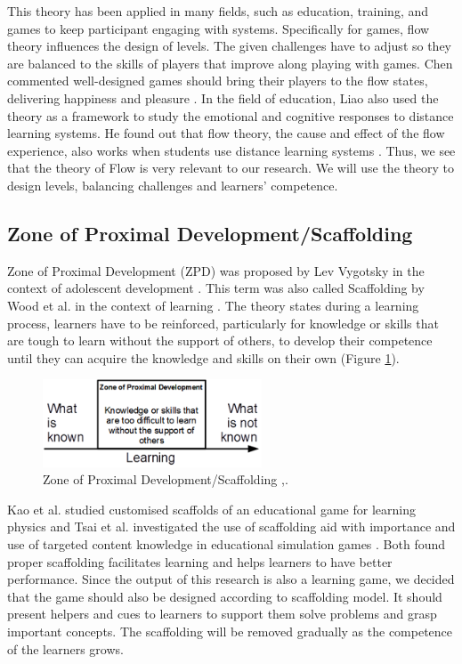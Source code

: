 \documentclass[12pt, a4paper]{report}
\begin{document}
This theory has been applied in many fields, such as education, training, and games to keep participant engaging with systems. Specifically for games, flow theory influences the design of levels. The given challenges have to adjust so they are balanced to the skills of players that improve along playing with games. Chen commented well-designed games should bring their players to the flow states, delivering happiness and pleasure \cite{chen2007flow}. In the field of education, Liao also used the theory as a framework to study the emotional and cognitive responses to distance learning systems. He found out that flow theory, the cause and effect of the flow experience, also works when students use distance learning systems \cite{liao2006flow}. Thus, we see that the theory of Flow is very relevant to our research. We will use the theory to design levels, balancing challenges and learners' competence. 

\subsection{Zone of Proximal Development/Scaffolding}
Zone of Proximal Development (ZPD) was proposed by Lev Vygotsky in the context of adolescent development \cite{vygotsky1978mind}. This term was also called Scaffolding by Wood et al. in the context of learning \cite{wood1976role}. The theory states during a learning process, learners have to be reinforced, particularly for knowledge or skills that are tough to learn without the support of others, to develop their competence until they can acquire the knowledge and skills on their own (Figure \ref{scaffolding}). 

\begin{figure}[ht]
\centering
\includegraphics[width=6.5cm]{scaffolding}
\caption{Zone of Proximal Development/Scaffolding \cite{vygotsky1978mind},\cite{wood1976role}.}
\label{scaffolding}
\end{figure}

Kao et al. studied customised scaffolds of an educational game for learning physics \cite{kao2015designing} and Tsai et al. investigated the use of scaffolding aid with importance and use of targeted content knowledge in educational simulation games \cite{tsai2013importance}. Both found proper scaffolding facilitates learning and helps learners to have better performance. Since the output of this research is also a learning game, we decided that the game should also be designed according to scaffolding model. It should present helpers and cues to learners to support them solve problems and grasp important concepts. The scaffolding will be removed gradually as the competence of the learners grows.
\end{document}
